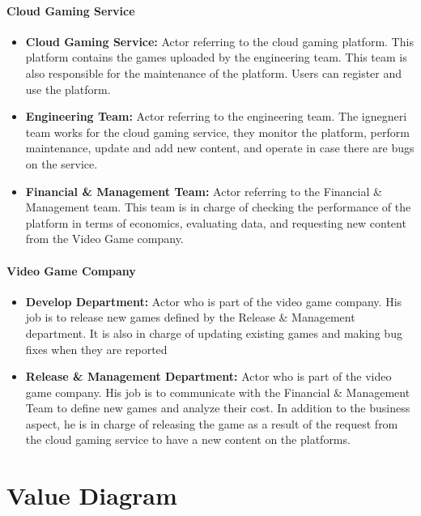 \documentclass[a4paper,12pt]{report}
\begin{document}
\paragraph*{Cloud Gaming Service}
\begin{itemize}
\item{\textbf{Cloud Gaming Service:} Actor referring to the cloud gaming platform.
This platform contains the games uploaded by the engineering team. This team is also responsible for the maintenance of the platform. Users can register and use the platform. } 
%
\item{\textbf{Engineering Team:}  Actor referring to the engineering team.
The ignegneri team works for the cloud gaming service, they monitor the platform, perform maintenance, update and add new content, and operate in case there are bugs on the service. } 
%
\item{\textbf{Financial \& Management Team:}  Actor referring to the Financial \& Management team.
This team is in charge of checking the performance of the platform in terms of economics, evaluating data, and requesting new content from the Video Game company. } 
%
\end{itemize}
%
%
\paragraph*{Video Game Company}
\begin{itemize}
\item{\textbf{Develop Department:} Actor who is part of the video game company.
His job is to release new games defined by the Release \& Management department. It is also in charge of updating existing games and making bug fixes when they are reported } 
%
\item{\textbf{Release \& Management Department:}  Actor who is part of the video game company.
His job is to communicate with the Financial \& Management Team to define new games and analyze their cost. In addition to the business aspect, he is in charge of releasing the game as a result of the request from the cloud gaming service to have a new content on the platforms.
} 
\end{itemize}
\section{Value Diagram}
\end{document}
